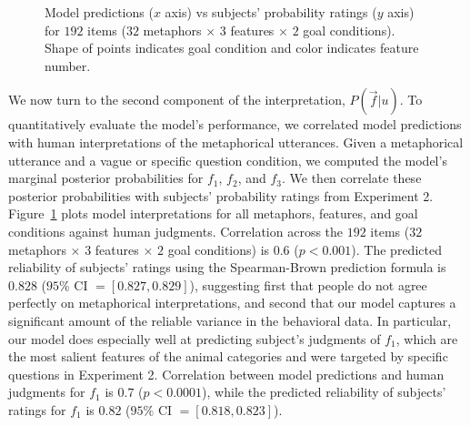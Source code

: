 \documentclass[10pt,letterpaper]{article}
\begin{document}
\begin{figure}[t]
\begin{center}
\end{center}
\caption{Model predictions ($x$ axis) vs subjects' probability ratings ($y$ axis) for $192$ items ($32$ metaphors $\times$ $3$ features $\times$ $2$ goal conditions). Shape of points indicates goal condition and color indicates feature number.} 
\label{scatter_full}
\end{figure}

We now turn to the second component of the interpretation, $P(\vec f | u)$. 
To quantitatively evaluate the model's performance, we correlated model predictions with human interpretations of the metaphorical utterances. Given a metaphorical utterance and a vague or specific question condition, we computed the model's marginal posterior probabilities for $f_1$, $f_2$, and $f_3$. We then correlate these posterior probabilities with subjects' probability ratings from Experiment 2. Figure~\ref{scatter_full} plots model interpretations for all metaphors, features, and goal conditions against human judgments. Correlation across the $192$ items ($32$ metaphors $\times$ $3$ features $\times$ $2$ goal conditions) is $0.6$ ($p < 0.001$). The predicted reliability of subjects' ratings using the Spearman-Brown prediction formula is $0.828$ ($95\%$ CI $=[0.827, 0.829]$), suggesting first that people do not agree perfectly on metaphorical interpretations, and second that our model captures a significant amount of the reliable variance in the behavioral data. In particular, our model does especially well at predicting subject's judgments of $f_1$, which are the most salient features of the animal categories and were targeted by specific questions in Experiment 2. Correlation between model predictions and human judgments for $f_1$ is $0.7$ ($p < 0.0001$), while the predicted reliability of subjects' ratings for $f_1$ is $0.82$ ($95\%$ CI $=[0.818, 0.823]$). 
\end{document}
